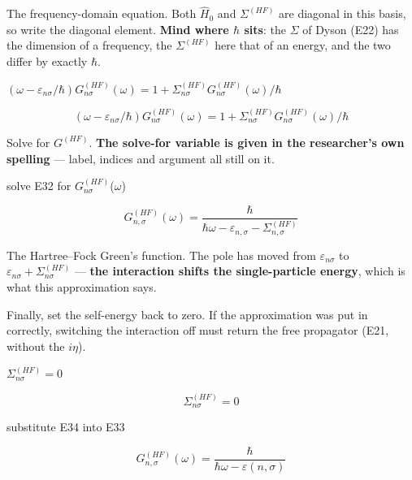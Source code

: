 \documentclass[dvipdfmx]{article}
\begin{document}
The frequency-domain equation. Both $\hat H_0$ and $\Sigma^{(HF)}$ are diagonal in this basis, so write the diagonal element. \textbf{Mind where $\hbar$ sits}: the $\Sigma$ of Dyson (E22) has the dimension of a frequency, the $\Sigma^{(HF)}$ here that of an energy, and the two differ by exactly $\hbar$.

$(\omega - \varepsilon_{n\sigma}/\hbar) G^{(HF)}_{n\sigma}(\omega) = 1 + \Sigma^{(HF)}_{n\sigma} G^{(HF)}_{n\sigma}(\omega)/\hbar$

\begin{equation}
  (\omega - \varepsilon_{n\sigma}/\hbar) G^{(HF)}_{n\sigma}(\omega) = 1 + \Sigma^{(HF)}_{n\sigma} G^{(HF)}_{n\sigma}(\omega)/\hbar
  \label{eq:E32}
\end{equation}

Solve for $G^{(HF)}$. \textbf{The solve-for variable is given in the researcher's own spelling} — label, indices and argument all still on it.

solve E32 for $G^{(HF)}_{n\sigma}$($\omega$)

\begin{equation}
  G^{(HF)}_{n,\sigma}(\omega) = \frac{\hbar}{\hbar \omega-\varepsilon_{n,\sigma}-\Sigma^{(HF)}_{n,\sigma}}
  \label{eq:E33}
\end{equation}

The Hartree–Fock Green's function. The pole has moved from $\varepsilon_{n\sigma}$ to $\varepsilon_{n\sigma}+\Sigma^{(HF)}_{n\sigma}$ — \textbf{the interaction shifts the single-particle energy}, which is what this approximation says.

Finally, set the self-energy back to zero. If the approximation was put in correctly, switching the interaction off must return the free propagator (E21, without the $i\eta$).

$\Sigma^{(HF)}_{n\sigma} = 0$

\begin{equation}
  \Sigma^{(HF)}_{n\sigma} = 0
  \label{eq:E34}
\end{equation}

substitute E34 into E33

\begin{equation}
  G^{(HF)}_{n,\sigma}(\omega) = \frac{\hbar}{\hbar \omega-\varepsilon\left(n , \sigma\right)}
  \label{eq:E35}
\end{equation}
\end{document}
